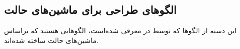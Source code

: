 \subsection{الگوهای طراحی برای ماشین‌های حالت}
\begin{RTL}
این دسته از الگوها که توسط  در \cite{ref1}
معرفی شده‌است، الگوهایی هستند که براساس ماشین‌های حالت ساخته شده‌اند.
\end{RTL}




